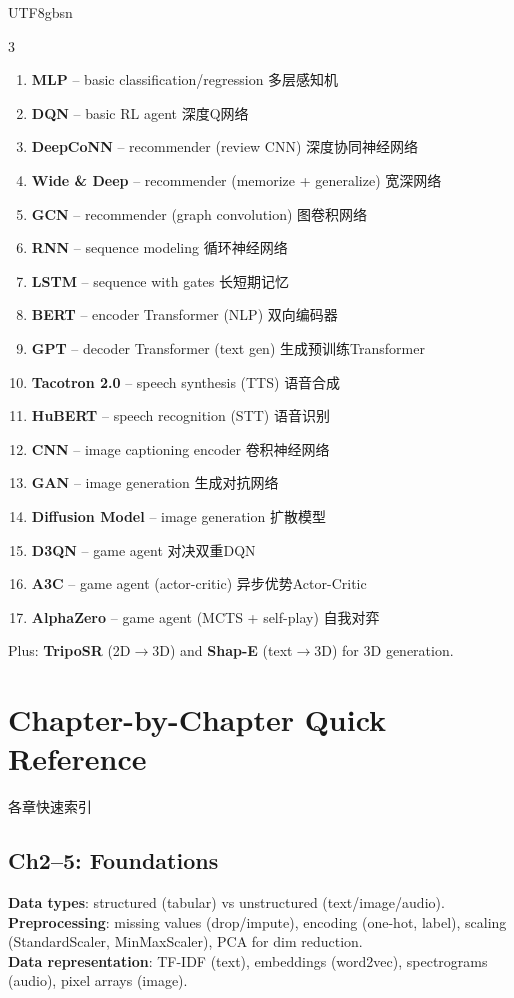 \documentclass[9pt,landscape,a4paper]{article}
\newcommand{\zhint}[1]{{\scriptsize\color{gray!70!black}#1}}
\begin{document}
\begin{CJK}{UTF8}{gbsn}
\begin{multicols}{3}
\begin{enumerate}[leftmargin=10pt,itemsep=0pt,topsep=0pt]
\item \textbf{MLP} -- basic classification/regression \zhint{多层感知机}
\item \textbf{DQN} -- basic RL agent \zhint{深度Q网络}
\item \textbf{DeepCoNN} -- recommender (review CNN) \zhint{深度协同神经网络}
\item \textbf{Wide \& Deep} -- recommender (memorize + generalize) \zhint{宽深网络}
\item \textbf{GCN} -- recommender (graph convolution) \zhint{图卷积网络}
\item \textbf{RNN} -- sequence modeling \zhint{循环神经网络}
\item \textbf{LSTM} -- sequence with gates \zhint{长短期记忆}
\item \textbf{BERT} -- encoder Transformer (NLP) \zhint{双向编码器}
\item \textbf{GPT} -- decoder Transformer (text gen) \zhint{生成预训练Transformer}
\item \textbf{Tacotron 2.0} -- speech synthesis (TTS) \zhint{语音合成}
\item \textbf{HuBERT} -- speech recognition (STT) \zhint{语音识别}
\item \textbf{CNN} -- image captioning encoder \zhint{卷积神经网络}
\item \textbf{GAN} -- image generation \zhint{生成对抗网络}
\item \textbf{Diffusion Model} -- image generation \zhint{扩散模型}
\item \textbf{D3QN} -- game agent \zhint{对决双重DQN}
\item \textbf{A3C} -- game agent (actor-critic) \zhint{异步优势Actor-Critic}
\item \textbf{AlphaZero} -- game agent (MCTS + self-play) \zhint{自我对弈}
\end{enumerate}

Plus: \textbf{TripoSR} (2D$\to$3D) and \textbf{Shap-E} (text$\to$3D) for 3D generation.

\section{Chapter-by-Chapter Quick Reference}
\zhint{各章快速索引}

\subsection{Ch2--5: Foundations}
\textbf{Data types}: structured (tabular) vs unstructured (text/image/audio).\\
\textbf{Preprocessing}: missing values (drop/impute), encoding (one-hot, label), scaling (StandardScaler, MinMaxScaler), PCA for dim reduction.\\
\textbf{Data representation}: TF-IDF (text), embeddings (word2vec), spectrograms (audio), pixel arrays (image).


\end{multicols}
\end{CJK}
\end{document}
